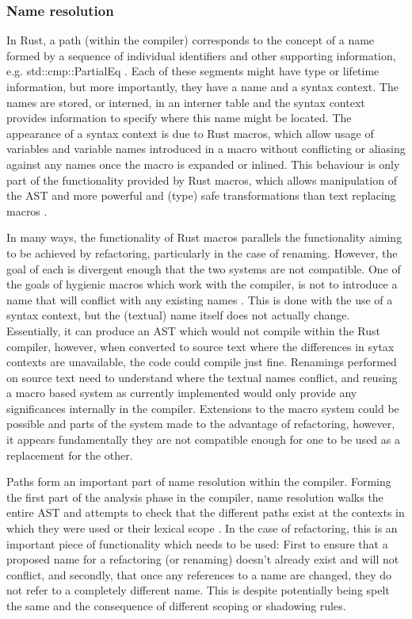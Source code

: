 \subsubsection{Name resolution}
In Rust, a path (within the compiler) corresponds to the concept of a name formed by a sequence of individual identifiers and other supporting information, e.g. std::cmp::PartialEq \cite{docpath15}. Each of these segments might have type or lifetime information, but more importantly, they have a name and a syntax context. The names are stored, or interned, in an interner table and the syntax context provides information to specify where this name might be located. The appearance of a syntax context is due to Rust macros, which allow usage of variables and variable names introduced in a macro without conflicting or aliasing against any names once the macro is expanded or inlined. This behaviour is only part of the functionality provided by Rust macros, which allows manipulation of the AST and more powerful and (type) safe transformations than text replacing macros \cite{keep15}.

In many ways, the functionality of Rust macros parallels the functionality aiming to be achieved by refactoring, particularly in the case of renaming. However, the goal of each is divergent enough that the two systems are not compatible. One of the goals of hygienic macros which work with the compiler, is not to introduce a name that will conflict with any existing names \cite{keep15}. This is done with the use of a syntax context, but the (textual) name itself does not actually change. Essentially, it can produce an AST which would not compile within the Rust compiler, however, when converted to source text where the differences in sytax contexts are unavailable, the code could compile just fine. Renamings performed on source text need to understand where the textual names conflict, and reusing a macro based system as currently implemented would only provide any significances internally in the compiler. Extensions to the macro system could be possible and parts of the system made to the advantage of refactoring, however, it appears fundamentally they are not compatible enough for one to be used as a replacement for the other.

Paths form an important part of name resolution within the compiler. Forming the first part of the analysis phase in the compiler, name resolution walks the entire AST and attempts to check that the different paths exist at the contexts in which they were used or their lexical scope \cite{driver15}. In the case of refactoring, this is an important piece of functionality which needs to be used: First to ensure that a proposed name for a refactoring (or renaming) doesn't already exist and will not conflict, and secondly, that once any references to a name are changed, they do not refer to a completely different name. This is despite potentially being spelt the same and the consequence of different scoping or shadowing rules.

